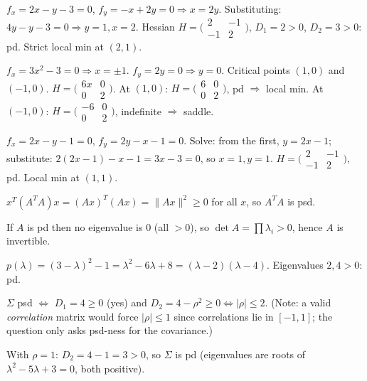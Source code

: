 \begin{solutions}
    \item $f_{x} = 2 x - y - 3 = 0$, $f_{y} = -x + 2 y = 0 \Rightarrow x = 2 y$. Substituting: $4 y - y - 3 = 0 \Rightarrow y = 1, x = 2$. Hessian $H = \bigl(\begin{smallmatrix} 2 & -1 \\ -1 & 2 \end{smallmatrix}\bigr)$, $D_{1} = 2 > 0$, $D_{2} = 3 > 0$: pd. Strict local min at $(2, 1)$.
    \item $f_{x} = 3 x^{2} - 3 = 0 \Rightarrow x = \pm 1$. $f_{y} = 2 y = 0 \Rightarrow y = 0$. Critical points $(1, 0)$ and $(-1, 0)$. $H = \bigl(\begin{smallmatrix} 6 x & 0 \\ 0 & 2 \end{smallmatrix}\bigr)$. At $(1, 0)$: $H = \bigl(\begin{smallmatrix} 6 & 0 \\ 0 & 2 \end{smallmatrix}\bigr)$, pd $\Rightarrow$ local min. At $(-1, 0)$: $H = \bigl(\begin{smallmatrix} -6 & 0 \\ 0 & 2 \end{smallmatrix}\bigr)$, indefinite $\Rightarrow$ saddle.
    \item $f_{x} = 2 x - y - 1 = 0$, $f_{y} = 2 y - x - 1 = 0$. Solve: from the first, $y = 2 x - 1$; substitute: $2(2 x - 1) - x - 1 = 3 x - 3 = 0$, so $x = 1, y = 1$. $H = \bigl(\begin{smallmatrix} 2 & -1 \\ -1 & 2 \end{smallmatrix}\bigr)$, pd. Local min at $(1, 1)$.
    \item $x^{T} (A^{T} A) x = (A x)^{T} (A x) = \|A x\|^{2} \ge 0$ for all $x$, so $A^{T} A$ is psd.
    \item If $A$ is pd then no eigenvalue is $0$ (all $> 0$), so $\det A = \prod \lambda_{i} > 0$, hence $A$ is invertible.
    \item $p(\lambda) = (3 - \lambda)^{2} - 1 = \lambda^{2} - 6 \lambda + 8 = (\lambda - 2)(\lambda - 4)$. Eigenvalues $2, 4 > 0$: pd.
    \item $\Sigma$ psd $\Leftrightarrow$ $D_{1} = 4 \ge 0$ (yes) and $D_{2} = 4 - \rho^{2} \ge 0 \Leftrightarrow |\rho| \le 2$. (Note: a valid \emph{correlation} matrix would force $|\rho| \le 1$ since correlations lie in $[-1, 1]$; the question only asks psd-ness for the covariance.)
    \item With $\rho = 1$: $D_{2} = 4 - 1 = 3 > 0$, so $\Sigma$ is pd (eigenvalues are roots of $\lambda^{2} - 5\lambda + 3 = 0$, both positive).

\end{solutions}
